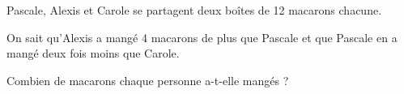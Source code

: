 
\medskip

Pascale, Alexis et Carole se partagent deux boîtes de 12 macarons chacune.

On sait qu'Alexis a mangé 4 macarons de plus que Pascale et que Pascale en a mangé deux fois
moins que Carole.

Combien de macarons chaque personne a-t-elle mangés ?

\bigskip

